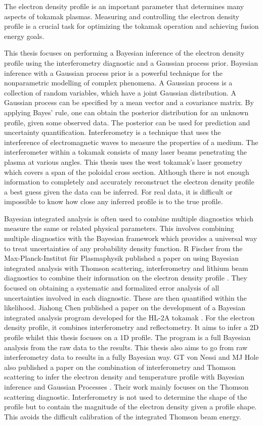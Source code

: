 The electron density profile is an important parameter that determines many aspects of tokamak plasmas. Measuring and controlling the electron density profile is a crucial task for optimizing the tokamak operation and achieving fusion energy goals.

This thesis focuses on performing a Bayesian inference of the electron density profile using the interferometry diagnostic and a Gaussian process prior. Bayesian inference with a Gaussian process prior is a powerful technique for the nonparametric modelling of complex phenomena. A Gaussian process is a collection of random variables, which have a joint Gaussian distribution. A Gaussian process can be specified by a mean vector and a covariance matrix. By applying Bayes’ rule, one can obtain the posterior distribution for an unknown profile, given some observed data. The posterior can be used for prediction and uncertainty quantification. Interferometry is a technique that uses the interference of electromagnetic waves to measure the properties of a medium. The interferometer within a tokamak consists of many laser beams penetrating the plasma at various angles. This thesis uses the \gls{west} tokamak's laser geometry which covers a span of the poloidal cross section. Although there is not enough information to completely and accurately reconstruct the electron density profile a best guess given the data can be inferred. For real data, it is difficult or impossible to know how close any inferred profile is to the true profile.

Bayesian integrated analysis is often used to combine multiple diagnostics which measure the same or related physical parameters. This involves combining multiple diagnostics with the Bayesian framework which provides a universal way to treat uncertainties of any probability density function. R Fischer from the Max-Planck-Institut für Plasmaphysik published a paper on using Bayesian integrated analysis with Thomson scattering, interferometry and lithium beam diagnostics to combine their information on the electron density profile \cite{IDAmaxPlanck}. They focused on obtaining a systematic and formalized error analysis of all uncertainties involved in each diagnostic. These are then quantified within the likelihood. Jiahong Chen published a paper on the development of a Bayesian integrated analysis program developed for the HL-2A tokamak \cite{IDAgeert2023}. For the electron density profile, it combines interferometry and reflectometry. It aims to infer a 2D profile whilst this thesis focuses on a 1D profile. The program is a full Bayesian analysis from the raw data to the results. This thesis also aims to go from raw interferometry data to results in a fully Bayesian way. GT von Nessi and MJ Hole also published a paper on the combination of interferometry and Thomson scattering to infer the electron density and temperature profile with Bayesian inference and Gaussian Processes \cite{nessiIBAmega-ampere-spherical}. Their work mainly focuses on the Thomson scattering diagnostic. Interferometry is not used to determine the shape of the profile but to contain the magnitude of the electron density given a profile shape. This avoids the difficult calibration of the integrated Thomson beam energy.  

